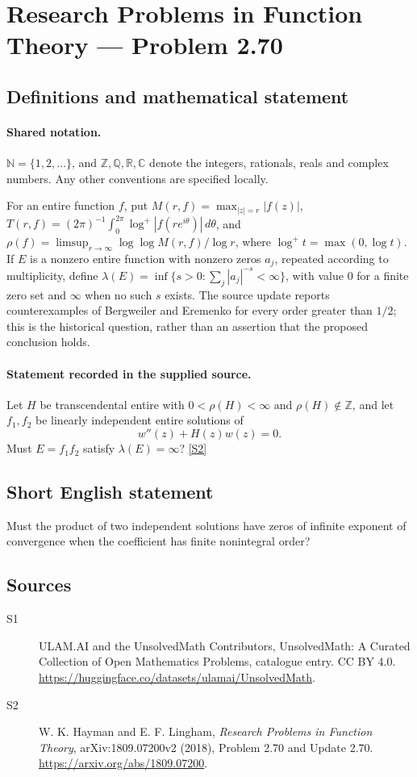 \documentclass[11pt]{article}
\newcommand{\sref}[2]{\hyperlink{source:#1:#2}{[S#2]}}
\begin{document}
\section{Research Problems in Function Theory — Problem 2.70}\label{statement}

\subsection{Definitions and mathematical statement}

\paragraph{Shared notation.}$\mathbb N=\{1,2,\ldots\}$, and $\mathbb Z,\mathbb Q,\mathbb R,\mathbb C$ denote the integers, rationals, reals and complex numbers. Any other conventions are specified locally.


For an entire function $f$, put $M(r,f)=\max_{|z|=r}|f(z)|$, $T(r,f)=(2\pi)^{-1}\int_0^{2\pi}\log^+|f(re^{i\theta})|\,d\theta$, and $\rho(f)=\limsup_{r\to\infty}\log\log M(r,f)/\log r$, where $\log^+t=\max(0,\log t)$. If $E$ is a nonzero entire function with nonzero zeros $a_j$, repeated according to multiplicity, define $\lambda(E)=\inf\{s>0:\sum_j|a_j|^{-s}<\infty\}$, with value $0$ for a finite zero set and $\infty$ when no such $s$ exists.
The source update reports counterexamples of Bergweiler and Eremenko for every order greater than $1/2$; this is the historical question, rather than an assertion that the proposed conclusion holds.
\paragraph{Statement recorded in the supplied source.}
Let $H$ be transcendental entire with $0<\rho(H)<\infty$ and $\rho(H)\notin\mathbb Z$, and let $f_1,f_2$ be linearly independent entire solutions of
\[w''(z)+H(z)w(z)=0.\]
Must $E=f_1f_2$ satisfy $\lambda(E)=\infty$? \sref{statement}{2}
\subsection{Short English statement}
Must the product of two independent solutions have zeros of infinite exponent of convergence when the coefficient has finite nonintegral order?
\subsection{Sources}
\begin{description}
\item[\hypertarget{source:statement:1}{S1}] ULAM.AI and the UnsolvedMath Contributors, UnsolvedMath: A Curated Collection of Open Mathematics Problems, catalogue entry. CC BY 4.0. \url{https://huggingface.co/datasets/ulamai/UnsolvedMath}.
\item[\hypertarget{source:statement:2}{S2}] W. K. Hayman and E. F. Lingham, \emph{Research Problems in Function Theory}, arXiv:1809.07200v2 (2018), Problem 2.70 and Update 2.70. \url{https://arxiv.org/abs/1809.07200}.
\end{description}
\label{end:statement}
\end{document}
